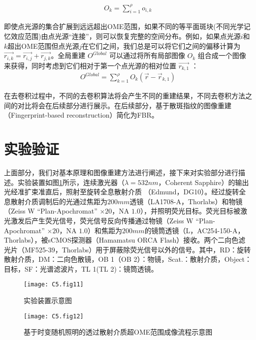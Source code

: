 \begin{equation}
		\begin{aligned}
O_{k} = \sum^{\rho}_{i=1}
o_{i,k}
\label{eq:5.5}
\end{aligned}
\end{equation}

即使点光源的集合扩展到远远超出OME范围，如果不同的等平面斑块(不同光学记忆效应范围)由点光源“连接”，则可以恢复完整的空间分布。例如，如果点光源$i$和$k$超出OME范围但点光源$j$在它们之间，我们总是可以将它们之间的偏移计算为 $\vec{r_{i,k}} = \vec {r_{i,j}} + \vec{r_{j,k}}$。全局重建 $O^{Global}$ 可以通过将所有局部图像 $O_{k}$ 组合成一个图像来获得，同时考虑到它们相对于第一个点光源的相对位置 $\vec{r_{k,1}}$ ：
\begin{equation}
	\begin{aligned}
O^{Global} = \sum^{\rho}_{k=1}
O_{k}(\overrightarrow{r} - \overrightarrow{r}_{k,1})
\label{eq:5.6}
\end{aligned}
\end{equation}

在去卷积过程中，不同的去卷积算法将会产生不同的重建结果，不同去卷积方法之间的对比将会在后续部分进行展示。在后续部分，基于散斑指纹的图像重建（Fingerprint-based reconstruction）简化为FBR。

\section{实验验证}

上面部分，我们对基本原理和图像重建方法进行阐述，接下来对实验部分进行描述。实验装置如图\ref{fig:5.11}所示，连续激光器（$\lambda  = 532 nm $，Coherent Sapphire）的输出光经准扩束准直后，照射至旋转全息散射介质 （Edmund，DG10）。经过旋转全息散射介质调制后的光通过焦距为$200 mm$透镜（LA1708-A，Thorlabs）和物镜（Zeiss W “Plan-Apochromat” $\times 20$，NA $1.0$），并照明荧光目标。荧光目标被激光激发后产生荧光信号，荧光信号反向传播通过物镜（Zeiss W “Plan-Apochromat” $\times 20$，NA $1.0$）和焦距为$200 mm$的镜筒透镜（L，AC254-150-A，Thorlabs），被sCMOS探测器（Hamamatsu ORCA Flash）接收。两个二向色滤光片（MF525-39，Thorlabs）用于屏蔽除荧光信号以外的信号。其中，RD：旋转散射介质，DM：二向色散镜，OB 1（OB 2）：物镜，Scat.：散射介质，Object：目标，SF：光谱滤波片，TL 1(TL 2)：镜筒透镜。

\begin{figure}[htp]
	\centering
	\texttt{[image: C5.fig11]}
	\caption{实验装置示意图}
	\label{fig:5.11}
\end{figure}

\begin{figure}[htp]
	\centering
	\texttt{[image: C5.fig12]}
	\caption{基于时变随机照明的透过散射介质超OME范围成像流程示意图}
	\label{fig:5.12}
\end{figure}


